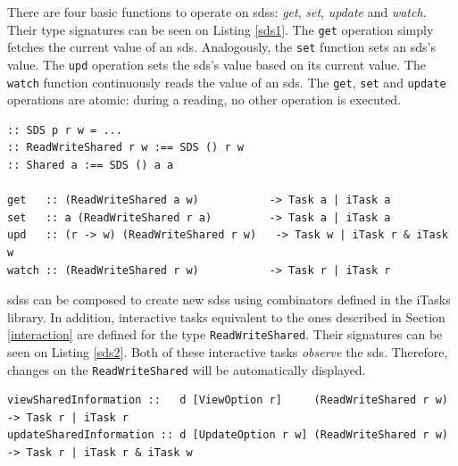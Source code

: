 There are four basic functions to operate on \acp{sds}: \textit{get}, \textit{set}, \textit{update} and \textit{watch}. Their type signatures can be seen on Listing \ref{sds1}. The \texttt{get} operation simply fetches the current value of an \ac{sds}. Analogously, the \texttt{set} function sets an \ac{sds}'s value. The \texttt{upd} operation sets the \ac{sds}'s value based on its current value. The \texttt{watch} function continuously reads the value of an \ac{sds}. The \texttt{get}, \texttt{set} and \texttt{update} operations are atomic: during a reading, no other operation is executed.

\begin{lstlisting}[caption=Shared Data Sources definitions,label=sds1,captionpos=b]
:: SDS p r w = ...
:: ReadWriteShared r w :== SDS () r w
:: Shared a :== SDS () a a

get   :: (ReadWriteShared a w)           -> Task a | iTask a
set   :: a (ReadWriteShared r a)         -> Task a | iTask a
upd   :: (r -> w) (ReadWriteShared r w)   -> Task w | iTask r & iTask w
watch :: (ReadWriteShared r w)           -> Task r | iTask r
\end{lstlisting}

\acp{sds} can be composed to create new \acp{sds} using combinators defined in the iTasks library. In addition, interactive tasks equivalent to the ones described in Section \ref{interaction} are defined for the type \texttt{ReadWriteShared}. Their signatures can be seen on Listing \ref{sds2}. Both of these interactive tasks \textit{observe} the \ac{sds}. Therefore, changes on the \texttt{ReadWriteShared} will be automatically displayed.

\begin{lstlisting}[caption=\ac{sds} interactive tasks,label=sds2,captionpos=b]
viewSharedInformation ::   d [ViewOption r]     (ReadWriteShared r w) -> Task r | iTask r 
updateSharedInformation :: d [UpdateOption r w] (ReadWriteShared r w) -> Task r | iTask r & iTask w
\end{lstlisting}